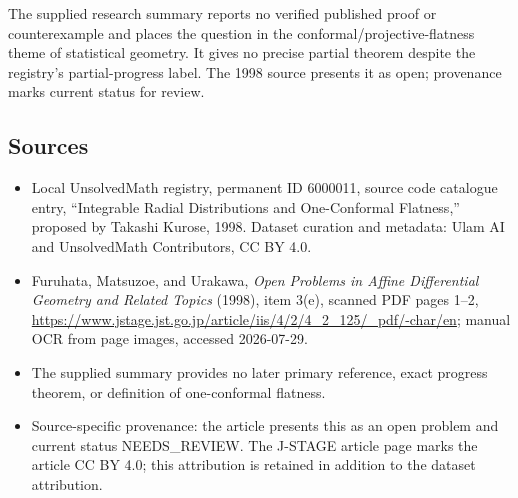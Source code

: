 \documentclass[11pt]{article}
\begin{document}
The supplied research summary reports no verified published proof or counterexample and places the question in the conformal/projective-flatness theme of statistical geometry. It gives no precise partial theorem despite the registry's partial-progress label. The 1998 source presents it as open; provenance marks current status for review.
\subsection{Sources}
\begin{itemize}
\item Local UnsolvedMath registry, permanent ID 6000011, source code catalogue entry, ``Integrable Radial Distributions and One-Conformal Flatness,'' proposed by Takashi Kurose, 1998. Dataset curation and metadata: Ulam AI and UnsolvedMath Contributors, CC BY 4.0.
\item Furuhata, Matsuzoe, and Urakawa, \emph{Open Problems in Affine Differential Geometry and Related Topics} (1998), item 3(e), scanned PDF pages 1--2, \url{https://www.jstage.jst.go.jp/article/iis/4/2/4_2_125/_pdf/-char/en}; manual OCR from page images, accessed 2026-07-29.
\item The supplied summary provides no later primary reference, exact progress theorem, or definition of one-conformal flatness.
\item Source-specific provenance: the article presents this as an open problem and current status NEEDS\_REVIEW. The J-STAGE article page marks the article CC BY 4.0; this attribution is retained in addition to the dataset attribution.
\end{itemize}
\end{document}
